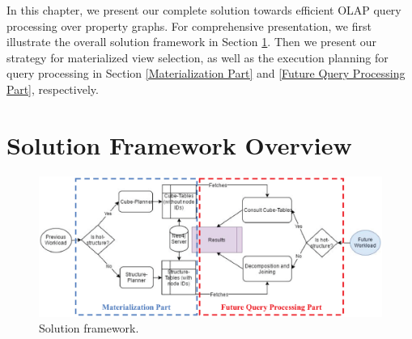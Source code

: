 
In this chapter, we present our complete solution towards efficient OLAP query processing over property graphs. For comprehensive presentation, we first illustrate the overall solution framework in Section \ref{s:4.1}. Then we present our strategy for materialized view selection, as well as the execution planning for query processing in Section \ref{Materialization Part} and \ref{Future Query Processing Part}, respectively.



\section{Solution Framework Overview}
\label{s:4.1}

\begin{figure}[T]
	\centering
	\includegraphics[scale=0.8]{pic/41.eps}
	\caption{Solution framework.}
	\label{Solution framework}
\end{figure}

